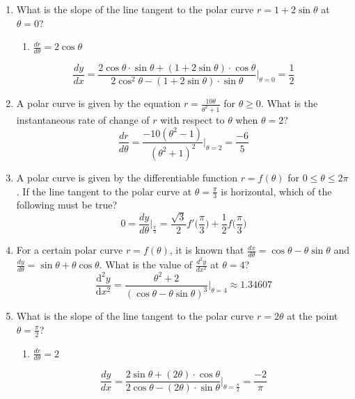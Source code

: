 \documentclass[12pt]{article}
\begin{document}
\begin{enumerate}
	\item What is the slope of the line tangent to the polar curve $r=1+2\sin \theta$ at $\theta=0$?
	      \begin{enumerate}
	      	\item $\frac{dr}{d\theta} = 2\cos \theta$
	      \end{enumerate}
	      $$\frac{dy}{dx} = \frac{2\cos\theta \cdot \sin \theta + (1+2\sin \theta) \cdot \cos\theta}{2\cos^2\theta -(1+2\sin \theta)\cdot \sin\theta}\biggr\rvert_{\theta=0} = \boxed{\frac{1}{2}}$$
	\item A polar curve is given by the equation $r=\frac{10\theta}{\theta^2+1}$ for $\theta \geq 0$. What is the instantaneous rate of change of $r$ with respect to $\theta$ when $\theta=2$?
	      $$\frac{dr}{d\theta} = \frac{-10(\theta^2-1)}{(\theta^2+1)^2}\biggr\rvert_{\theta = 2} = \boxed{\frac{-6}{5}}$$
	\item A polar curve is given by the differentiable function $r=f(\theta)$ for $0\leq \theta \leq 2\pi$. If the line tangent to the polar curve at $\theta=\frac{\pi}{3}$ is horizontal, which of the following must be true?
	      $$0=\frac{dy}{d\theta}\biggr\rvert_{\frac{\pi}{3}} = \boxed{\frac{\sqrt{3}}{2}f'\bigg(\frac{\pi}{3}\bigg)+\frac{1}{2}f\bigg(\frac{\pi}{3}\bigg)} $$
	\item For a certain polar curve $r=f(\theta)$, it is known that $\frac{dx}{d\theta} = \cos \theta - \theta\sin\theta$ and $\frac{dy}{d\theta} = \sin \theta + \theta\cos \theta$. What is the value of $\frac{d^2y}{dx^2}$ at $\theta=4$?
	      $$\frac{\mathrm{d}^2y}{\mathrm{d}x^2} = \frac{\theta^2+2}{(\cos\theta - \theta\sin\theta)^3}\biggr\rvert_{\theta = 4} \approx \boxed{1.34607}$$
	\item What is the slope of the line tangent to the polar curve $r=2\theta$ at the point $\theta=\frac{\pi}{2}$?
	      \begin{enumerate}
	      	\item $\frac{dr}{d\theta} = 2$
	      \end{enumerate}
	      $$\frac{dy}{dx} = \frac{2 \sin \theta + (2\theta) \cdot \cos\theta}{2\cos\theta -(2\theta)\cdot \sin\theta}\biggr\rvert_{\theta=\frac{\pi}{2}} = \boxed{\frac{-2}{\pi}}$$
	      	      	

\end{enumerate}
\end{document}
